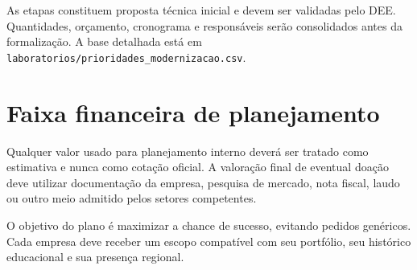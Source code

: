 \documentclass[11pt,a4paper]{article}
\begin{document}
As etapas constituem proposta técnica inicial e devem ser validadas pelo DEE. Quantidades, orçamento, cronograma e responsáveis serão consolidados antes da formalização. A base detalhada está em \texttt{laboratorios/prioridades\_modernizacao.csv}.

\section{Faixa financeira de planejamento}
Qualquer valor usado para planejamento interno deverá ser tratado como estimativa e nunca como cotação oficial. A valoração final de eventual doação deve utilizar documentação da empresa, pesquisa de mercado, nota fiscal, laudo ou outro meio admitido pelos setores competentes.

\begin{destaque}
O objetivo do plano é maximizar a chance de sucesso, evitando pedidos genéricos. Cada empresa deve receber um escopo compatível com seu portfólio, seu histórico educacional e sua presença regional.
\end{destaque}
\end{document}
